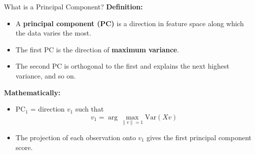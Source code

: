 \documentclass[aspectratio=169,xcolor=dvipsnames]{beamer}
\begin{document}
\begin{frame}{What is a Principal Component?}
  \textbf{Definition:}
  \begin{itemize}
    \item A \textbf{principal component (PC)} is a direction in feature space along which the data varies the most.
    \item The first PC is the direction of \textbf{maximum variance}.
    \item The second PC is orthogonal to the first and explains the next highest variance, and so on.
  \end{itemize}

  \vspace{0.2cm}
  \textbf{Mathematically:}
  \begin{itemize}
    \item PC$_1$ = direction $v_1$ such that
    \[
    v_1 = \arg\max_{\|v\| = 1} \text{Var}(Xv)
    \]
    \item The projection of each observation onto $v_1$ gives the first principal component score.
  \end{itemize}
\end{frame}
\end{document}
